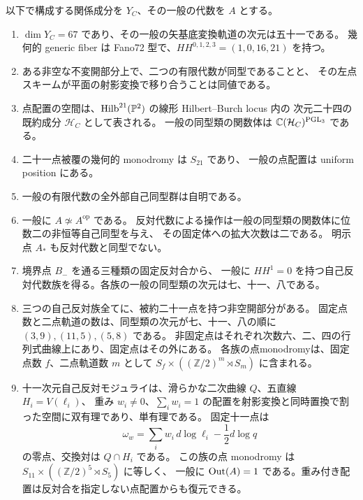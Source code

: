 \begin{theorem}[主結果]\label{thm:main}
以下で構成する関係成分を $Y_C$、その一般の代数を $A$ とする。
\begin{enumerate}
\item $\dim Y_C=67$ であり、その一般の矢基底変換軌道の次元は五十一である。
幾何的 generic fiber は Fano72 型で、$HH^{0,1,2,3}=(1,0,16,21)$ を持つ。
\item ある非空な不変開部分上で、二つの有限代数が同型であることと、
その左点スキームが平面の射影変換で移り合うことは同値である。
\item 点配置の空間は、$\operatorname{Hilb}^{21}(\mathbb P^2)$ の線形 Hilbert--Burch locus 内の
次元二十四の既約成分 $\mathcal H_C$ として表される。
一般の同型類の関数体は $\mathbb C(\mathcal H_C)^{\operatorname{PGL}_3}$ である。
\item 二十一点被覆の幾何的 monodromy は $S_{21}$ であり、
一般の点配置は uniform position にある。
\item 一般の有限代数の全外部自己同型群は自明である。
\item 一般に $A\not\simeq A^{\mathrm{op}}$ である。
反対代数による操作は一般の同型類の関数体に位数二の非恒等自己同型を与え、
その固定体への拡大次数は二である。
明示点 $A_*$ も反対代数と同型でない。
\item 境界点 $B_-$ を通る三種類の固定反対合から、
一般に $HH^1=0$ を持つ自己反対代数族を得る。各族の一般の同型類の次元は七、十一、八である。
\item 三つの自己反対族全てに、被約二十一点を持つ非空開部分がある。
固定点数と二点軌道の数は、同型類の次元が七、十一、八の順に
$(3,9),(11,5),(5,8)$ である。
非固定点はそれぞれ次数六、二、四の行列式曲線上にあり、固定点はその外にある。
各族の点monodromyは、固定点数 $f$、二点軌道数 $m$ として
$S_f\times((\mathbb Z/2)^m\rtimes S_m)$ に含まれる。
\item 十一次元自己反対モジュライは、滑らかな二次曲線 $Q$、五直線 $H_i=V(\ell_i)$、
重み $w_i\ne0$、$\sum_iw_i=1$ の配置を射影変換と同時置換で割った空間に双有理であり、単有理である。
固定十一点は
\[
 \omega_w=\sum_iw_i\,d\log\ell_i-\frac12d\log q
\]
の零点、交換対は $Q\cap H_i$ である。
この族の点 monodromy は $S_{11}\times((\mathbb Z/2)^5\rtimes S_5)$ に等しく、
一般に $\operatorname{Out}(A)=1$ である。重み付き配置は反対合を指定しない点配置からも復元できる。
\end{enumerate}
\end{theorem}

